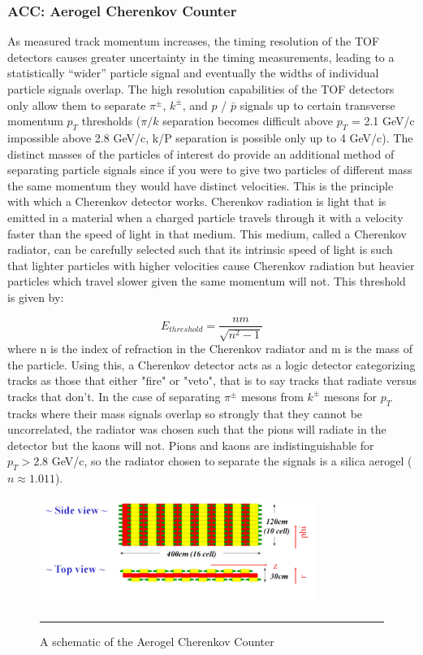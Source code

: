 \subsubsection{ACC: Aerogel Cherenkov Counter}
As measured track momentum increases, the timing resolution of the TOF detectors causes greater uncertainty in the timing measurements, leading to a statistically ``wider'' particle signal and eventually the widths of individual particle signals overlap. The high resolution capabilities of the TOF detectors only allow them to separate $\pi^{\pm}$, $k^{\pm}$, and $p$ / $\bar{p}$ signals up to certain transverse momentum $p_{T}$ thresholds ($\pi/k$ separation becomes difficult above $p_T$ = 2.1 GeV/c impossible above 2.8 GeV/c, k/P separation is possible only up to 4 GeV/c). The distinct masses of the particles of interest do provide an additional method of separating particle signals since if you were to give two particles of different mass the same momentum they would have distinct velocities. This is the principle with which a Cherenkov detector works. Cherenkov radiation is light that is emitted in a material when a charged particle travels through it with a velocity faster than the speed of light in that medium. This medium, called a Cherenkov radiator, can be carefully selected such that its intrinsic speed of light is such that lighter particles with higher velocities cause Cherenkov radiation but heavier particles which travel slower given the same momentum will not. This threshold is given by:

\begin{equation}
E_{threshold} = \frac{nm}{\sqrt{n^2-1}}
\end{equation}
where n is the index of refraction in the Cherenkov radiator and m is the mass of the particle.
Using this, a Cherenkov detector acts as a logic detector categorizing tracks as those that either "fire" or "veto", that is to say tracks that radiate versus tracks that don't. In the case of separating $\pi^{\pm}$ mesons from $k^{\pm}$ mesons for $p_{T}$ tracks where their mass signals overlap so strongly that they cannot be uncorrelated, the radiator was chosen such that the pions will radiate in the detector but the kaons will not. Pions and kaons are indistinguishable for $p_{T} > 2.8$ GeV/c, so the radiator chosen to separate the signals is a silica aerogel ($n \approx 1.011$).

\begin{figure}[htbp!]
  \centering
    \includegraphics[width=0.8\textwidth]{Figures/ACCschematic.jpg}
    \rule{35em}{0.5pt}
  \caption[A schematic of the Aerogel Cherenkov Counter]{A schematic of the Aerogel Cherenkov Counter}
  \label{fig:ACCschematic}
\end{figure}

